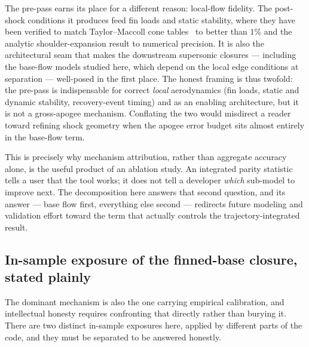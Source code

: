 The pre-pass earns its place for a different reason: local-flow fidelity. The
post-shock conditions it produces feed fin loads and static stability, where they
have been verified to match Taylor--Maccoll cone
tables~\cite{taylormaccoll1933,sims1964} to better than $1\%$ and the analytic
shoulder-expansion result to numerical precision. It is also the architectural
seam that makes the downstream supersonic closures --- including the base-flow
models studied here, which depend on the local edge conditions at separation ---
well-posed in the first place. The honest framing is thus twofold: the pre-pass
is indispensable for correct \emph{local} aerodynamics (fin loads, static and
dynamic stability, recovery-event timing) and as an enabling architecture, but it
is not a gross-apogee mechanism. Conflating the two would misdirect a reader
toward refining shock geometry when the apogee error budget sits almost entirely
in the base-flow term.

This is precisely why mechanism attribution, rather than aggregate accuracy
alone, is the useful product of an ablation study. An integrated parity statistic
tells a user that the tool works; it does not tell a developer \emph{which}
sub-model to improve next. The decomposition here answers that second question,
and its answer --- base flow first, everything else second --- redirects future
modeling and validation effort toward the term that actually controls the
trajectory-integrated result.

\subsection{In-sample exposure of the finned-base closure, stated plainly}
\label{sec:disc-insample}

The dominant mechanism is also the one carrying empirical calibration, and
intellectual honesty requires confronting that directly rather than burying it.
There are two distinct in-sample exposures here, applied by different parts of the
code, and they must be separated to be answered honestly.

